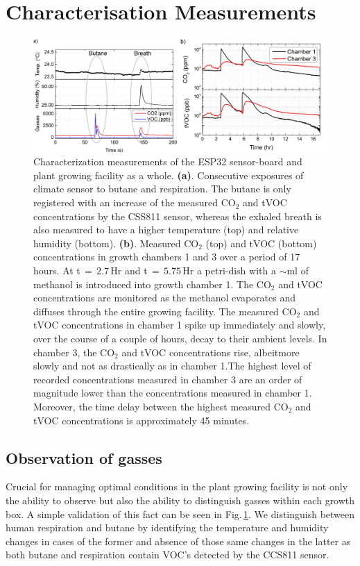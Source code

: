 \documentclass[reprint,superscriptaddress,aps,amsmath,amssymb]{revtex4-1}
\begin{document}
\section{Characterisation Measurements}
\begin{figure}
    \centering
    \includegraphics[width = \textwidth]{test_measurements.jpg}
    \caption{Characterization measurements of the ESP32 sensor-board and plant growing facility as a whole. \textbf{(a)}.  Consecutive exposures of climate sensor to butane and respiration. The butane is only registered with an increase of the measured CO$_2$ and tVOC concentrations by the CSS811 sensor, whereas the exhaled breath is also measured to have a higher temperature (top) and relative humidity (bottom). \textbf{(b)}. Measured CO$_{2}$ (top) and tVOC (bottom) concentrations in growth chambers 1 and 3 over a period of 17 hours. At t$\,=\,2.7$\,Hr and t$\,=\,5.75$\,Hr a petri-dish with a $\sim$ml of methanol is introduced into growth chamber 1. The CO$_{2}$ and tVOC concentrations are monitored as the methanol evaporates and diffuses through the entire growing facility. The measured CO$_{2}$ and tVOC concentrations in chamber 1 spike up immediately and slowly, over the course of a couple of hours, decay to their ambient levels. In chamber 3, the CO$_{2}$ and tVOC concentrations rise, albeitmore slowly and not as drastically as in chamber 1.The highest level of recorded concentrations measured in chamber 3 are an order of magnitude lower than the concentrations measured in chamber 1. Moreover, the time delay between the highest measured CO$_2$ and tVOC concentrations is approximately 45 minutes.}
    \label{fig:butane vs. breath}
\end{figure}

\subsection{Observation of gasses}
Crucial for managing optimal conditions in the plant growing facility is not only the ability to observe but also the ability to distinguish gasses within each growth box. A simple validation of this fact can be seen in Fig.\,\ref{fig:butane vs. breath}. We distinguish between human respiration and butane by identifying the temperature and humidity changes in cases of the former and absence of those same changes in the latter as both butane and respiration contain VOC's detected by the CCS811 sensor. 
\end{document}
